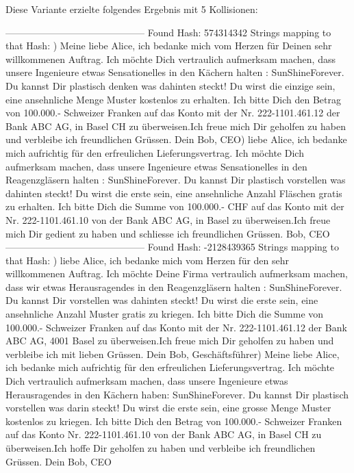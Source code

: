 \documentclass[12pt]{scrartcl}
\begin{document}
Diese Variante erzielte folgendes Ergebnis mit 5 Kollisionen:

--------------------------------------------\newline
Found Hash: 574314342\newline
Strings mapping to that Hash: ) Meine liebe Alice, ich bedanke mich vom Herzen für Deinen sehr willkommenen Auftrag. Ich möchte Dich vertraulich aufmerksam machen, dass unsere Ingenieure etwas Sensationelles in den Kächern  halten : SunShineForever. Du kannst Dir plastisch denken was dahinten steckt! Du wirst die einzige sein, eine ansehnliche Menge Muster kostenlos zu erhalten. Ich bitte Dich den Betrag von 100.000.- Schweizer Franken auf das Konto mit der Nr. 222-1101.461.12 der  Bank ABC AG, in Basel CH zu überweisen.Ich freue mich Dir geholfen zu haben und verbleibe ich freundlichen Grüssen. Dein Bob, CEO) liebe Alice, ich bedanke mich aufrichtig für den erfreulichen Lieferungsvertrag. Ich möchte Dich aufmerksam machen, dass unsere Ingenieure etwas Sensationelles in den Reagenzgläsern  halten : SunShineForever. Du kannst Dir plastisch vorstellen was dahinten steckt! Du wirst die erste  sein, eine ansehnliche Anzahl Fläschen gratis zu erhalten. Ich bitte Dich die Summe von 100.000.- CHF auf das Konto mit der Nr. 222-1101.461.10 von der Bank ABC AG, in Basel zu überweisen.Ich freue mich Dir gedient zu haben und schliesse ich freundlichen Grüssen. Bob, CEO\newline
--------------------------------------------\newline
Found Hash: -2128439365\newline
Strings mapping to that Hash: ) liebe Alice, ich bedanke mich vom Herzen für den sehr willkommenen Auftrag. Ich möchte Deine Firma vertraulich aufmerksam machen, dass wir etwas Herausragendes in den Reagenzgläsern  halten : SunShineForever. Du kannst Dir  vorstellen was dahinten steckt! Du wirst die erste  sein, eine ansehnliche Anzahl Muster gratis zu kriegen. Ich bitte Dich die Summe von 100.000.- Schweizer Franken auf das Konto mit der Nr. 222-1101.461.12 der  Bank ABC AG, 4001 Basel zu überweisen.Ich freue mich Dir geholfen zu haben und verbleibe ich mit lieben Grüssen. Dein Bob, Geschäftsführer) Meine liebe Alice, ich bedanke mich aufrichtig für den erfreulichen Lieferungsvertrag. Ich möchte Dich vertraulich aufmerksam machen, dass unsere Ingenieure etwas Herausragendes in den Kächern haben: SunShineForever. Du kannst Dir plastisch vorstellen was darin steckt! Du wirst die erste  sein, eine grosse Menge Muster kostenlos zu kriegen. Ich bitte Dich den Betrag von 100.000.- Schweizer Franken auf das Konto Nr. 222-1101.461.10 von der Bank ABC AG, in Basel CH zu überweisen.Ich hoffe Dir geholfen zu haben und verbleibe ich freundlichen Grüssen. Dein Bob, CEO\newline
\end{document}
